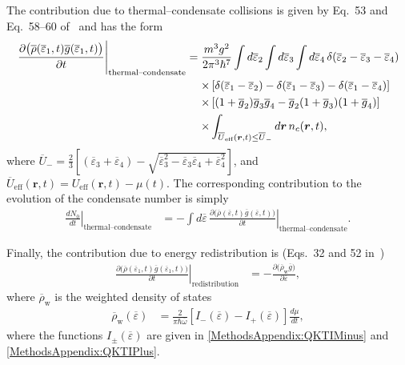 The contribution due to thermal--condensate collisions is given by Eq.~53 and Eq.~58--60 of~\citep{Bijlsma:2000} and has the form
\begin{align}
    \begin{split}
        \left. \frac{\partial\big(\overline{\rho}(\overline{\varepsilon}_1, t) \overline{g}(\overline{\varepsilon}_1, t)\big)}{\partial t}\right|_\text{thermal--condensate} &= \frac{m^3 g^2}{2 \pi^3 \hbar^7} \int d \overline{\varepsilon}_2 \int d\overline{\varepsilon}_3 \int d\overline{\varepsilon}_4 \,\delta(\overline{\varepsilon}_2 - \overline{\varepsilon}_3 - \overline{\varepsilon}_4)\\
        &\relphantom{=}\times\left[ \delta(\overline{\varepsilon}_1 - \overline{\varepsilon}_2) - \delta(\overline{\varepsilon}_1 - \overline{\varepsilon}_3) - \delta(\overline{\varepsilon}_1- \overline{\varepsilon}_4)\right]\\
        &\relphantom{=} \times \left[(1+\overline{g}_2)\overline{g}_3 \overline{g}_4 - \overline{g}_2 (1+\overline{g}_3)(1+\overline{g}_4) \right]\\
        &\relphantom{=}\times  \int_{\overline{U}_\text{eff}(\bm{r}, t) \leq \overline{U}_-} d \bm{r}\, n_c(\bm{r}, t),
    \end{split}
    \label{MethodsAppendix:QKTRhoGThermalCondensateEvolution}
\end{align}
where $\displaystyle \overline{U}_- = \frac{2}{3}\left[(\overline{\varepsilon}_3 + \overline{\varepsilon}_4)-\sqrt{\overline{\varepsilon}_3^2 - \overline{\varepsilon}_3 \overline{\varepsilon}_4 + \overline{\varepsilon}_4^2}\right]$, and $\overline{U}_\text{eff}(\bm{r}, t) = U_\text{eff}(\bm{r}, t) - \mu(t)$.
The corresponding contribution to the evolution of the condensate number is simply
\begin{align}
    \left. \frac{d N_0}{d t}\right|_\text{thermal--condensate} &= - \int d\overline{\varepsilon} \,\left. \frac{\partial\big(\overline{\rho}(\overline{\varepsilon}, t) \overline{g}(\overline{\varepsilon}, t)\big)}{\partial t}\right|_\text{thermal--condensate}.
    \label{MethodsAppendix:QKTNThermalCondensateEvolution}
\end{align}


Finally, the contribution due to energy redistribution is (Eqs.~32 and 52 in~\citep{Bijlsma:2000})
\begin{align}
    \left. \frac{\partial\big(\overline{\rho}(\overline{\varepsilon}_1, t) \overline{g}(\overline{\varepsilon}_1, t)\big)}{\partial t}\right|_\text{redistribution} &= - \frac{\partial \big( \overline{\rho}_\text{w} \overline{g}\big)}{\partial \overline{\varepsilon}},
    \label{MethodsAppendix:QKTRedistributionEvolution}
\end{align}
where $\overline{\rho}_\text{w}$ is the weighted density of states
\begin{align}
    \overline{\rho}_\text{w}(\overline{\varepsilon}) &= \frac{2}{\pi \hbar \overline{\omega}} \left[ I_-(\overline{\varepsilon}) - I_+(\overline{\varepsilon})\right] \frac{d \mu}{dt},
\end{align}
where the functions $I_\pm(\overline{\varepsilon})$ are given in \eqref{MethodsAppendix:QKTIMinus} and \eqref{MethodsAppendix:QKTIPlus}.


